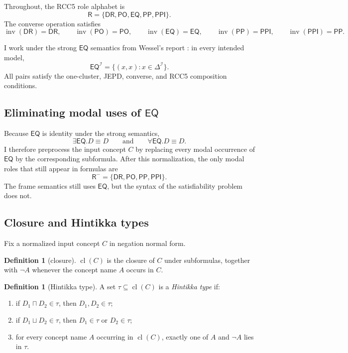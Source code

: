 \documentclass[11pt]{article}
\theoremstyle{definition}
\newtheorem{definition}[theorem]{Definition}
\newcommand{\cl}{\operatorname{cl}}
\newcommand{\Roles}{\mathsf{R}}
\newcommand{\Eq}{\mathsf{EQ}}
\newcommand{\Dr}{\mathsf{DR}}
\newcommand{\Po}{\mathsf{PO}}
\newcommand{\Pp}{\mathsf{PP}}
\newcommand{\Ppi}{\mathsf{PPI}}
\newcommand{\inv}{\operatorname{inv}}
\begin{document}
Throughout, the RCC5 role alphabet is
\[
\Roles = \{\Dr,\Po,\Eq,\Pp,\Ppi\}.
\]
The converse operation satisfies
\[
\inv(\Dr)=\Dr,\qquad \inv(\Po)=\Po,\qquad \inv(\Eq)=\Eq,\qquad \inv(\Pp)=\Ppi,\qquad \inv(\Ppi)=\Pp.
\]

I work under the strong $\Eq$ semantics from Wessel's report \cite{Wessel2003}: in every intended model,
\[
\Eq^{\mathcal I}=\{(x,x):x\in \Delta^{\mathcal I}\}.
\]
All pairs satisfy the one-cluster, JEPD, converse, and RCC5 composition conditions.

\subsection{Eliminating modal uses of $\Eq$}

Because $\Eq$ is identity under the strong semantics,
\[
\exists \Eq.D \equiv D
\qquad\text{and}\qquad
\forall \Eq.D \equiv D.
\]
I therefore preprocess the input concept $C$ by replacing every modal occurrence of $\Eq$ by the corresponding subformula. After this normalization, the only modal roles that still appear in formulas are
\[
\Roles^- = \{\Dr,\Po,\Pp,\Ppi\}.
\]
The frame semantics still uses $\Eq$, but the syntax of the satisfiability problem does not.

\subsection{Closure and Hintikka types}

Fix a normalized input concept $C$ in negation normal form.

\begin{definition}[closure]
$\cl(C)$ is the closure of $C$ under subformulas, together with $\neg A$ whenever the concept name $A$ occurs in $C$.
\end{definition}

\begin{definition}[Hintikka type]
A set $\tau\subseteq \cl(C)$ is a \emph{Hintikka type} if:
\begin{enumerate}[label=(T\arabic*)]
    \item if $D_1\sqcap D_2\in \tau$, then $D_1,D_2\in \tau$;
    \item if $D_1\sqcup D_2\in \tau$, then $D_1\in \tau$ or $D_2\in \tau$;
    \item for every concept name $A$ occurring in $\cl(C)$, exactly one of $A$ and $\neg A$ lies in $\tau$.
\end{enumerate}
\end{definition}
\end{document}
